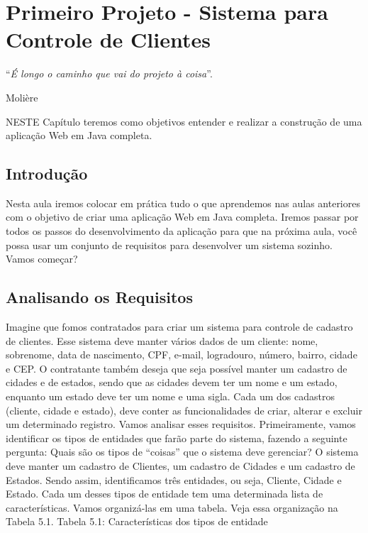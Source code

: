 \chapter{Primeiro Projeto - Sistema para Controle de Clientes}
\epigraph{``\textit{É longo o caminho que vai do projeto à coisa}''.}{Molière}

\lettrine[lines=4, lhang=0.1, lraise=0, loversize=0.2, findent=0.1em]{\textcolor{corAzulTema}{N}}{ESTE} Capítulo teremos como objetivos entender e realizar a construção de uma aplicação Web em Java completa.


\section{Introdução}


Nesta aula iremos colocar em prática tudo o que aprendemos nas aulas anteriores com o objetivo de criar uma aplicação Web em Java completa. Iremos passar por todos os passos do desenvolvimento da aplicação para que na próxima aula, você possa usar um conjunto de requisitos para desenvolver um sistema sozinho. Vamos começar?

\section{Analisando os Requisitos}

Imagine que fomos contratados para criar um sistema para controle de cadastro de clientes. Esse sistema deve manter vários dados de um cliente: nome, sobrenome, data de nascimento, CPF, e-mail, logradouro, número, bairro, cidade e CEP. O contratante também deseja que seja possível manter um cadastro de cidades e de estados, sendo que as cidades devem ter um nome e um estado, enquanto um estado deve ter um nome e uma sigla. Cada um dos cadastros (cliente, cidade e estado), deve conter as funcionalidades de criar, alterar e excluir um determinado registro.
Vamos analisar esses requisitos. Primeiramente, vamos identificar os tipos de entidades que farão parte do sistema, fazendo a seguinte pergunta: Quais são os tipos de “coisas” que o sistema deve gerenciar? O sistema deve manter um cadastro de Clientes, um cadastro de Cidades e um cadastro de Estados. Sendo assim, identificamos três entidades, ou seja, Cliente, Cidade e Estado.
Cada um desses tipos de entidade tem uma determinada lista de características. Vamos organizá-las em uma tabela. Veja essa organização na Tabela 5.1.
Tabela 5.1: Características dos tipos de entidade

